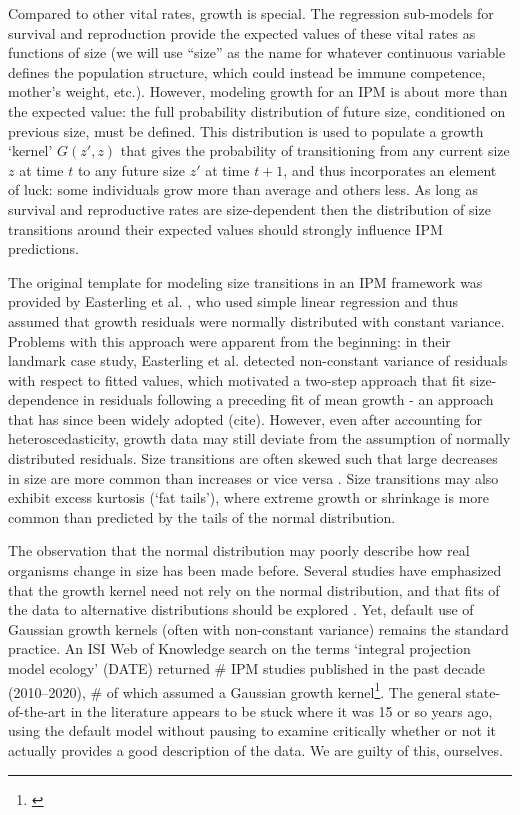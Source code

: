 \documentclass[11pt]{article}
\newcommand{\tom}[2]{{\color{red}{#1}}\footnote{\textit{\color{red}{#2}}}}
\begin{document}
{Compared to other vital rates, growth is special. 
The regression sub-models for survival and reproduction provide the expected values of these vital rates as functions of size (we will use ``size'' as the name
for whatever continuous variable defines the population structure, which could instead be immune competence, mother's weight, etc.).   
However, modeling growth for an IPM is about more than the expected value: the full probability distribution of future size, conditioned on previous size, must be defined. 
This distribution is used to populate a growth `kernel' $G(z',z)$ that gives the probability of transitioning from any current size $z$ at time $t$ to any future size $z'$ at time $t+1$, and thus incorporates an element of luck: some individuals grow more than average and others less.
As long as survival and reproductive rates are size-dependent then the distribution of size transitions around their expected values should strongly influence IPM predictions. 

The original template for modeling size transitions in an IPM framework was provided by Easterling et al. \citeyear{easterling2000size}, who used simple linear regression and thus assumed that growth residuals were normally distributed with constant variance. 
Problems with this approach were apparent from the beginning: in their landmark case study, Easterling et al. detected non-constant variance of residuals with respect to fitted values, which motivated a two-step approach that fit size-dependence in residuals following a preceding fit of mean growth - an approach that has since been widely adopted (cite). 
However, even after accounting for heteroscedasticity, growth data may still deviate from the assumption of normally distributed residuals. 
Size transitions are often skewed such that large decreases in size are more common than increases \citep{peterson2019improving,salguero2010keeping} or vice versa \citep{stubberud2019effects}.
Size transitions may also exhibit excess kurtosis (`fat tails'), where extreme growth or shrinkage is more common than predicted by the tails of the normal distribution. 

The observation that the normal distribution may poorly describe how real organisms change in size has been made before. 
Several studies have emphasized that the growth kernel need not rely on the normal distribution, and that fits of the data to alternative distributions should be explored \citep{easterling2000size,peterson2019improving,rees2014building,williams2012avoiding}. 
Yet, default use of Gaussian growth kernels (often with non-constant variance) remains the standard practice. 
An ISI Web of Knowledge search on the terms `integral projection model ecology' (DATE) returned \# IPM studies published in the past decade (2010--2020), \# of which assumed a Gaussian growth kernel\tom{}{Not sure if this is worth the trouble of doing, so I am just writing in placeholders for now. I think I know what I would find.}.
The general state-of-the-art in the literature appears to be stuck where it was 15 or so years ago, using the default model without pausing to examine critically whether or not it actually provides a good description of the data. 
We are guilty of this, ourselves. 

}
\end{document}
